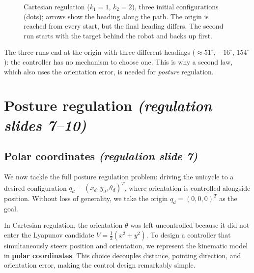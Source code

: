 \documentclass[11pt,a4paper]{article}
\def\bm#1{#1}%
\theoremstyle{definition}
\theoremstyle{plain}
\theoremstyle{remark}
\begin{document}
\begin{figure}[ht]
\caption{Cartesian regulation ($k_1=1$, $k_2=2$), three initial configurations (dots); arrows show the heading along the path. The origin is reached from every start, but the final heading differs. The second run starts with the target behind the robot and backs up first.}
\label{fig:cartsim}
\end{figure}


\begin{intuition}
The three runs end at the origin with three different headings ($\approx 51^\circ$, $-16^\circ$, $154^\circ$): the controller has no mechanism to choose one. This is why a second law, which also uses the orientation error, is needed for \emph{posture} regulation.
\end{intuition}

\section{Posture regulation \emph{(regulation slides 7--10)}}

\subsection{Polar coordinates \emph{(regulation slide 7)}}

We now tackle the full posture regulation problem: driving the unicycle to a desired configuration $\bm q_d=(x_d,y_d,\theta_d)^T$, where orientation is controlled alongside position. Without loss of generality, we take the origin $\bm q_d=(0,0,0)^T$ as the goal.

In Cartesian regulation, the orientation $\theta$ was left uncontrolled because it did not enter the Lyapunov candidate $V=\frac{1}{2}(x^2+y^2)$. To design a controller that simultaneously steers position and orientation, we represent the kinematic model in \textbf{polar coordinates}. This choice decouples distance, pointing direction, and orientation error, making the control design remarkably simple.
\end{document}
